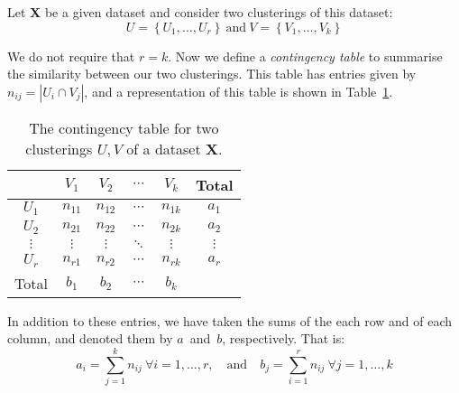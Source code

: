 \begin{definition}\label{def:contingency}
    Let \textbf{X} be a given dataset and consider two clusterings of this
    dataset:
    \[
        U = \left\{U_1, \ldots, U_r\right\}
        \ \text{and} \
        V = \left\{V_1, \ldots, V_k\right\}
    \]

    We do not require that \(r = k\). Now we define a \emph{contingency table}
    to summarise the similarity between our two clusterings. This table has
    entries given by \(n_{ij} = |U_i \cap V_j|\), and a representation of this
    table is shown in Table~\ref{tab:contingency}.

    \begin{table}[H]
    \centering
    \begin{tabular}{cccccc}
        {} & \(V_1\) & \(V_2\) & \(\cdots\) & \(V_k\) & Total
        \\ \midrule
        \(U_1\) & \(n_{11}\) & \(n_{12}\) & \(\cdots\) & \(n_{1k}\) & \(a_1\)
        \\
        \(U_2\) & \(n_{21}\) & \(n_{22}\) & \(\cdots\) & \(n_{2k}\) & \(a_2\)
        \\
        \(\vdots\) & \(\vdots\) & \(\vdots\) & \(\ddots\) & \(\vdots\) &
        \(\vdots\)
        \\
        \(U_r\) & \(n_{r1}\) & \(n_{r2}\) & \(\cdots\) & \(n_{rk}\) & \(a_r\)
        \\ \midrule
        Total & \(b_1\) & \(b_2\) & \(\cdots\) & \(b_k\) & {}
    \end{tabular}
    \caption{The contingency table for two clusterings \(U, V\) of a dataset
    \textbf{X}.}\label{tab:contingency}
    \end{table}

    In addition to these entries, we have taken the sums of the each row and of
    each column, and denoted them by \(a\)~and~\(b\), respectively. That is:
    \[
        a_i = \sum_{j=1}^k n_{ij} \ \forall i = 1, \ldots, r, \quad \text{and}
        \quad b_j = \sum_{i=1}^r n_{ij} \ \forall j = 1, \ldots, k
    \]\\
\end{definition}

\begin{definition}\label{def:adjusted-rand-index}
\end{definition}

\begin{definition}\label{def:adjusted-mutual-info}
\end{definition}

